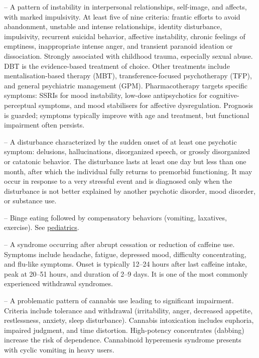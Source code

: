 -- A pattern of instability in interpersonal relationships, self-image, and affects, with marked impulsivity. At least five of nine criteria: frantic efforts to avoid abandonment, unstable and intense relationships, identity disturbance, impulsivity, recurrent suicidal behavior, affective instability, chronic feelings of emptiness, inappropriate intense anger, and transient paranoid ideation or dissociation. Strongly associated with childhood trauma, especially sexual abuse. DBT is the evidence-based treatment of choice. Other treatments include mentalisation-based therapy (MBT), transference-focused psychotherapy (TFP), and general psychiatric management (GPM). Pharmacotherapy targets specific symptoms: SSRIs for mood instability, low-dose antipsychotics for cognitive-perceptual symptoms, and mood stabilisers for affective dysregulation. Prognosis is guarded; symptoms typically improve with age and treatment, but functional impairment often persists.

-- A disturbance characterized by the sudden onset of at least one psychotic symptom: delusions, hallucinations, disorganized speech, or grossly disorganized or catatonic behavior. The disturbance lasts at least one day but less than one month, after which the individual fully returns to premorbid functioning. It may occur in response to a very stressful event and is diagnosed only when the disturbance is not better explained by another psychotic disorder, mood disorder, or substance use.

-- Binge eating followed by compensatory behaviors (vomiting, laxatives, exercise). See \hyperlink{Pediatrics}{pediatrics}.

-- A syndrome occurring after abrupt cessation or reduction of caffeine use. Symptoms include headache, fatigue, depressed mood, difficulty concentrating, and flu-like symptoms. Onset is typically 12--24 hours after last caffeine intake, peak at 20--51 hours, and duration of 2--9 days. It is one of the most commonly experienced withdrawal syndromes.

-- A problematic pattern of cannabis use leading to significant impairment. Criteria include tolerance and withdrawal (irritability, anger, decreased appetite, restlessness, anxiety, sleep disturbance). Cannabis intoxication includes euphoria, impaired judgment, and time distortion. High-potency concentrates (dabbing) increase the risk of dependence. Cannabinoid hyperemesis syndrome presents with cyclic vomiting in heavy users.


